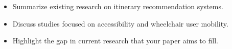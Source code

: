 \begin{itemize}
    \item Summarize existing research on itinerary recommendation systems.
    \item Discuss studies focused on accessibility and wheelchair user mobility.
    \item Highlight the gap in current research that your paper aims to fill.
\end{itemize}